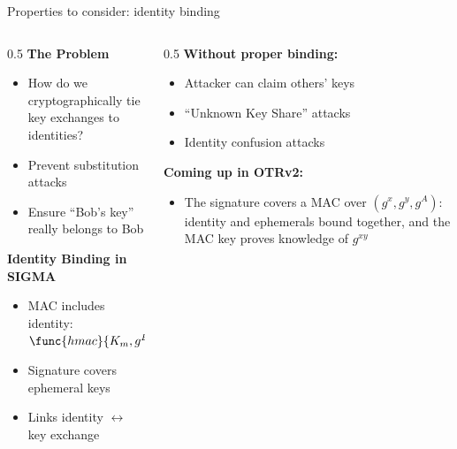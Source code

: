 \ifdefined\PRESENTATION\else\PassOptionsToClass{handout}{beamer}\fi\documentclass[aspectratio=169, lualatex]{beamer}
\begin{document}
\begin{frame}{Properties to consider: identity binding}
	\begin{columns}
		\begin{column}{0.5\textwidth}
			\textbf{The Problem}
			\begin{itemize}
				\item How do we cryptographically tie key exchanges to identities?
				\item Prevent substitution attacks
				\item Ensure ``Bob's key'' really belongs to Bob
			\end{itemize}
			\textbf{Identity Binding in SIGMA}
			\begin{itemize}
				\item MAC includes identity: $\func{hmac}{K_m, g^B}$
				\item Signature covers ephemeral keys
				\item Links identity $\leftrightarrow$ key exchange
			\end{itemize}
		\end{column}
		\begin{column}{0.5\textwidth}
			\textbf{Without proper binding:}
			\begin{itemize}
				\item Attacker can claim others' keys
				\item ``Unknown Key Share'' attacks
				\item Identity confusion attacks
			\end{itemize}
			\textbf{Coming up in OTRv2:}
			\begin{itemize}
				\item The signature covers a MAC over $(g^x, g^y, g^A)$: identity and ephemerals bound together, and the MAC key proves knowledge of $g^{xy}$
			\end{itemize}
		\end{column}
	\end{columns}
\end{frame}
\end{document}
